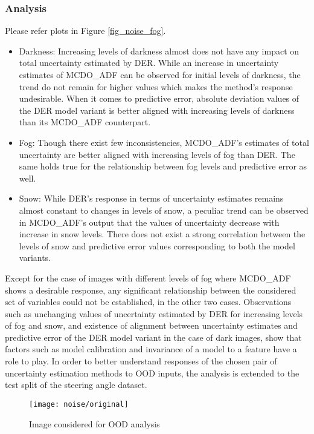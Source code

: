 \subsubsection{Analysis}
Please refer plots in Figure \ref{fig_noise_fog}.
\begin{itemize}
	\item Darkness: Increasing levels of darkness almost does not have any impact on total uncertainty estimated by DER. While an increase in uncertainty estimates of MCDO\_ADF can be observed for initial levels of darkness, the trend do not remain for higher values which makes the method's response undesirable. When it comes to predictive error, absolute deviation values of the DER model variant is better aligned with increasing levels of darkness than its MCDO\_ADF counterpart. 
	\item Fog: Though there exist few inconsistencies, MCDO\_ADF's estimates of total uncertainty are better aligned with increasing levels of fog than DER. The same holds true for the relationship between fog levels and predictive error as well.
	\item Snow: While DER's response in terms of uncertainty estimates remains almost constant to changes in levels of snow, a peculiar trend can be observed in MCDO\_ADF's output that the values of uncertainty decrease with increase in snow levels. There does not exist a strong correlation between the levels of snow and predictive error values corresponding to both the model variants. 
\end{itemize}
Except for the case of images with different levels of fog where MCDO\_ADF shows a desirable response, any significant relationship between the considered set of variables could not be established, in the other two cases. Observations such as unchanging values of uncertainty estimated by DER for increasing levels of fog and snow, and existence of alignment between uncertainty estimates and predictive error of the DER model variant in the case of dark images, show that factors such as model calibration and invariance of a model to a feature have a role to play. In order to better understand responses of the chosen pair of uncertainty estimation methods to OOD inputs, the analysis is extended to the test split of the steering angle dataset.
 \begin{figure}[H]
	\centering
	\texttt{[image: noise/original]}
	\caption{Image considered for OOD analysis}
	\label{fig_original_noise}
	\hfill
\end{figure}
